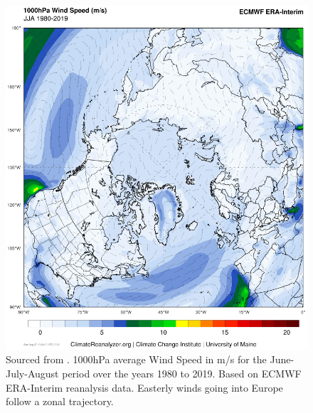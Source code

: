     \begin{figure}
        \centering
        \includegraphics[width=\textwidth]{figures/erai_56.png}
        \caption{Sourced from \cite{ClimateReanalyzer2023}. 1000hPa average Wind Speed in m/s for the June-July-August period over the years 1980 to 2019. Based on ECMWF ERA-Interim reanalysis data. Easterly winds going into Europe follow a zonal trajectory.}
        \label{fig:CR23_JJA_1000hPa_wind}
    \end{figure}